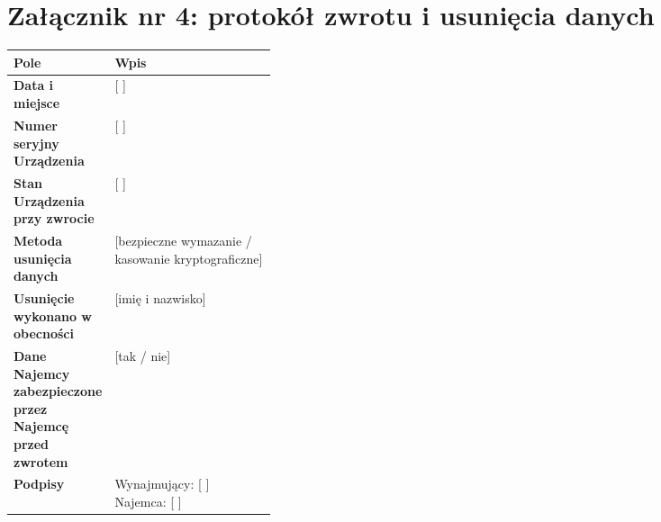 \documentclass[11pt,a4paper]{article}
\begin{document}
\section*{Załącznik nr 4: protokół zwrotu i usunięcia danych}

\begin{tabularx}{\linewidth}{@{}>{\bfseries}p{0.34\linewidth}X@{}}
\toprule
Pole & Wpis \\
\midrule
Data i miejsce & [ ] \\
Numer seryjny Urządzenia & [ ] \\
Stan Urządzenia przy zwrocie & [ ] \\
Metoda usunięcia danych & [bezpieczne wymazanie / kasowanie kryptograficzne] \\
Usunięcie wykonano w obecności & [imię i nazwisko] \\
Dane Najemcy zabezpieczone przez Najemcę przed zwrotem & [tak / nie] \\
Podpisy & Wynajmujący: [ ] \quad Najemca: [ ] \\
\bottomrule
\end{tabularx}
\end{document}
